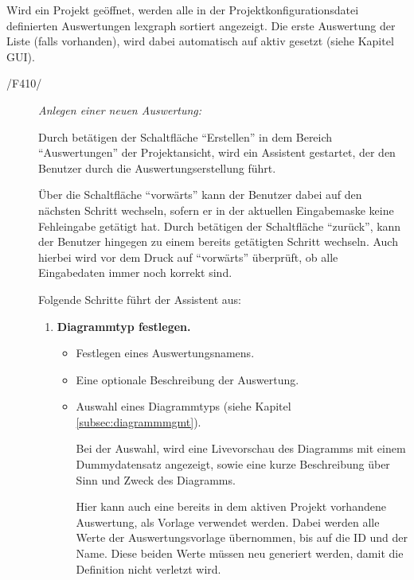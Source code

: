 	Wird ein Projekt geöffnet, werden alle in der Projektkonfigurationsdatei definierten Auswertungen \gls{lexgraph} sortiert angezeigt. Die erste Auswertung der Liste (falls vorhanden), wird dabei automatisch auf aktiv gesetzt (siehe Kapitel GUI).

	\begin{description}
		
		\item[/F410/] \textit{Anlegen einer neuen Auswertung:}\par Durch betätigen der Schaltfläche "`Erstellen"' in dem Bereich "`Auswertungen"' der Projektansicht, wird ein Assistent gestartet, der den Benutzer durch die Auswertungserstellung führt.\par Über die Schaltfläche "`vorwärts"' kann der Benutzer dabei auf den nächsten Schritt wechseln, sofern er in der aktuellen Eingabemaske keine Fehleingabe getätigt hat. Durch betätigen der Schaltfläche "`zurück"', kann der Benutzer hingegen zu einem bereits getätigten Schritt wechseln. Auch hierbei wird vor dem Druck auf "`vorwärts"' überprüft, ob alle Eingabedaten immer noch korrekt sind.\par Folgende Schritte führt der Assistent aus:

			\begin{enumerate}

				\item \textbf{Diagrammtyp festlegen.}

					\begin{itemize}

						\item Festlegen eines Auswertungsnamens.

						\item Eine optionale Beschreibung der Auswertung.

						\item Auswahl eines Diagrammtyps (siehe Kapitel \ref{subsec:diagrammmgmt}).\par Bei der Auswahl, wird eine Livevorschau des Diagramms mit einem Dummydatensatz angezeigt, sowie eine kurze Beschreibung über Sinn und Zweck des Diagramms.\par Hier kann auch eine bereits in dem aktiven Projekt vorhandene Auswertung, als Vorlage verwendet werden. Dabei werden alle Werte der Auswertungsvorlage übernommen, bis auf die ID und der Name. Diese beiden Werte müssen neu generiert werden, damit die Definition nicht verletzt wird.

					\end{itemize}


\end{enumerate}
\end{description}
